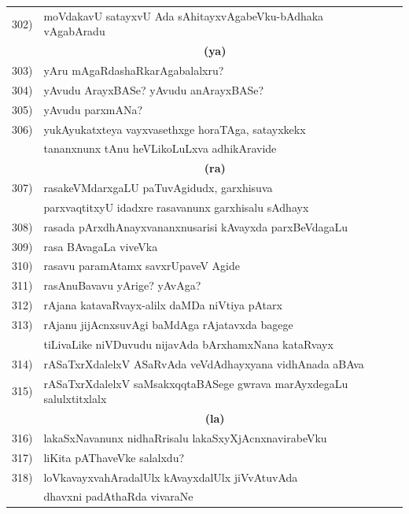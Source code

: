 \begin{longtable}{@{}cp{7.4cm}r}
302) & moVdakavU satayxvU Ada sAhitayxvAgabeVku-bAdhaka vAgabAradu & \pageref{page78}\\
     & \multicolumn{1}{c}{\textbf{(ya)}} & \\[0.3cm]
303) & yAru mAgaRdashaRkarAgabalalxru? & \pageref{page24}\\
304)& yAvudu ArayxBASe? yAvudu anArayxBASe? & \pageref{page174}\\
305) & yAvudu parxmANa? & \pageref{page134a}\\
306) & yukAyukatxteya vayxvasethxge horaTAga, satayxkekx & \\
     & tananxnunx tAnu heVLikoLuLxva adhikAravide & \pageref{page249}\\[0.3cm]
     & \multicolumn{1}{c}{\textbf{(ra)}} & \\[0.3cm]
307) &  rasakeVMdarxgaLU paTuvAgidudx, garxhisuva & \\
     & parxvaqtitxyU idadxre rasavanunx garxhisalu sAdhayx & \pageref{page222}\\         
308) & rasada pArxdhAnayxvananxnusarisi kAvayxda parxBeVdagaLu & \pageref{page240a}\\
309) & rasa BAvagaLa viveVka    & \pageref{page224}\\ 
310) & rasavu paramAtamx savxrUpaveV Agide & \pageref{page222b}\\
311) & rasAnuBavavu yArige? yAvAga? &\pageref{page227a}\\
312) & rAjana katavaRvayx-alilx daMDa niVtiya pAtarx &\pageref{page92b}\\
313) & rAjanu jijAcnxsuvAgi baMdAga rAjatavxda bagege  & \\
     & tiLivaLike niVDuvudu nijavAda bArxhamxNana kataRvayx &\pageref{page253b}\\ 
314) & rASaTxrXdalelxV ASaRvAda veVdAdhayxyana vidhAnada aBAva & \pageref{page47a}\\
315) & rASaTxrXdalelxV saMsakxqqtaBASege gwrava marAyxdegaLu salulxtitxlalx & \pageref{page30b}\\[0.3cm]
     & \multicolumn{1}{c}{\textbf{(la)}} & \\[0.3cm]
316) & lakaSxNavanunx nidhaRrisalu lakaSxyXjAcnxnavirabeVku & \pageref{page3}\\
317) & liKita pAThaveVke salalxdu? & \pageref{page123a}\\
318) & loVkavayxvahAradalUlx kAvayxdalUlx jiVvAtuvAda & \\
     & dhavxni padAthaRda vivaraNe & \pageref{page235}\\[0.3cm]  

\end{longtable}
